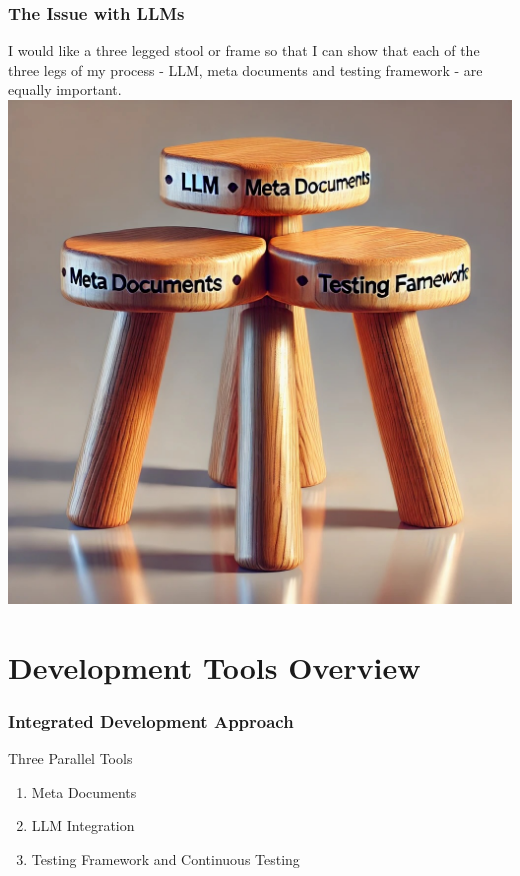 \documentclass{beamer}
\begin{document}
\begin{frame}
    \frametitle{The Issue with LLMs}
    \begin{center}
        I would like a three legged stool or frame so that I can show that each of the three legs of my process - LLM, meta documents and testing framework - are equally important.
        \pause
        \vspace{0.5cm}
        \includegraphics[height=0.6\textheight]{stool.jpg}
    \end{center}
\end{frame}

\section{Development Tools Overview}
\begin{frame}
    \frametitle{Integrated Development Approach}
    \begin{block}{Three Parallel Tools}
        \begin{enumerate}
            \item Meta Documents \pause
            \item LLM Integration \pause
            \item Testing Framework and Continuous Testing \pause
        \end{enumerate}
    \end{block}
\end{frame}
\end{document}
